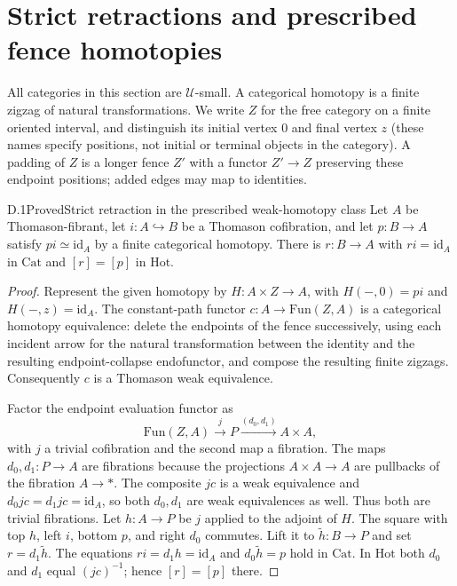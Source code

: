 \section{Strict retractions and prescribed fence homotopies}
\label{sec:D}

All categories in this section are $\mathcal U$-small. A categorical homotopy is a finite zigzag of natural transformations. We write $Z$ for the free category on a finite oriented interval, and distinguish its initial vertex $0$ and final vertex $z$ (these names specify positions, not initial or terminal objects in the category). A padding of $Z$ is a longer fence $Z'$ with a functor $Z'\to Z$ preserving these endpoint positions; added edges may map to identities.

\begin{claim}{D.1}{Proved}{Strict retraction in the prescribed weak-homotopy class}
Let $A$ be Thomason-fibrant, let $i:A\hookrightarrow B$ be a Thomason cofibration, and let $p:B\to A$ satisfy $pi\simeq\mathrm{id}_A$ by a finite categorical homotopy. There is $r:B\to A$ with $ri=\mathrm{id}_A$ in $\mathrm{Cat}$ and $[r]=[p]$ in $\mathrm{Hot}$.
\end{claim}
\begin{proof}
Represent the given homotopy by $H:A\times Z\to A$, with $H(-,0)=pi$ and $H(-,z)=\mathrm{id}_A$. The constant-path functor $c:A\to\mathrm{Fun}(Z,A)$ is a categorical homotopy equivalence: delete the endpoints of the fence successively, using each incident arrow for the natural transformation between the identity and the resulting endpoint-collapse endofunctor, and compose the resulting finite zigzags. Consequently $c$ is a Thomason weak equivalence.

Factor the endpoint evaluation functor as
\[
 \mathrm{Fun}(Z,A)\xrightarrow{j}P
 \xrightarrow{(d_0,d_1)}A\times A,
\]
with $j$ a trivial cofibration and the second map a fibration. The maps $d_0,d_1:P\to A$ are fibrations because the projections $A\times A\to A$ are pullbacks of the fibration $A\to *$. The composite $jc$ is a weak equivalence and $d_0jc=d_1jc=\mathrm{id}_A$, so both $d_0,d_1$ are weak equivalences as well. Thus both are trivial fibrations. Let $h:A\to P$ be $j$ applied to the adjoint of $H$. The square with top $h$, left $i$, bottom $p$, and right $d_0$ commutes. Lift it to $\widetilde h:B\to P$ and set $r=d_1\widetilde h$. The equations $ri=d_1h=\mathrm{id}_A$ and $d_0\widetilde h=p$ hold in $\mathrm{Cat}$. In $\mathrm{Hot}$ both $d_0$ and $d_1$ equal $(jc)^{-1}$; hence $[r]=[p]$ there.
\end{proof}

